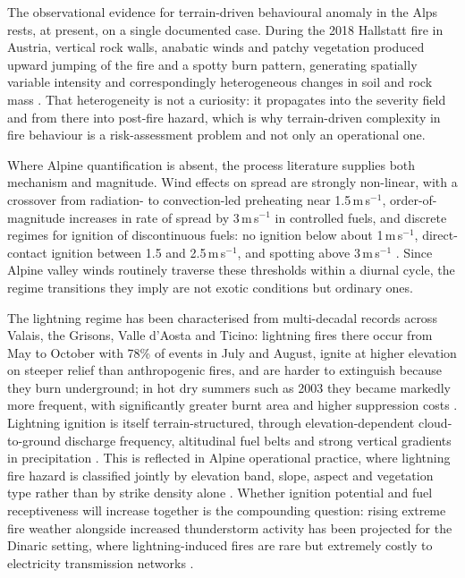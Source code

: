\documentclass[11pt,a4paper]{article}
\begin{document}
The observational evidence for terrain-driven behavioural anomaly in the Alps rests, at present, on a single documented case. During the 2018 Hallstatt fire in Austria, vertical rock walls, anabatic winds and patchy vegetation produced upward jumping of the fire and a spotty burn pattern, generating spatially variable intensity and correspondingly heterogeneous changes in soil and rock mass \citep{melzner_brief_2019}. That heterogeneity is not a curiosity: it propagates into the severity field and from there into post-fire hazard, which is why terrain-driven complexity in fire behaviour is a risk-assessment problem and not only an operational one.

Where Alpine quantification is absent, the process literature supplies both mechanism and magnitude. Wind effects on spread are strongly non-linear, with a crossover from radiation- to convection-led preheating near 1.5\,m\,s$^{-1}$, order-of-magnitude increases in rate of spread by 3\,m\,s$^{-1}$ in controlled fuels, and discrete regimes for ignition of discontinuous fuels: no ignition below about 1\,m\,s$^{-1}$, direct-contact ignition between 1.5 and 2.5\,m\,s$^{-1}$, and spotting above 3\,m\,s$^{-1}$ \citep{hayajneh_wind_2026}. Since Alpine valley winds routinely traverse these thresholds within a diurnal cycle, the regime transitions they imply are not exotic conditions but ordinary ones.

The lightning regime has been characterised from multi-decadal records across Valais, the Grisons, Valle d'Aosta and Ticino: lightning fires there occur from May to October with 78\% of events in July and August, ignite at higher elevation on steeper relief than anthropogenic fires, and are harder to extinguish because they burn underground; in hot dry summers such as 2003 they became markedly more frequent, with significantly greater burnt area and higher suppression costs \citep{conedera_lightninginduced_2006}. Lightning ignition is itself terrain-structured, through elevation-dependent cloud-to-ground discharge frequency, altitudinal fuel belts and strong vertical gradients in precipitation \citep{baranovskiy_deterministic_2021}. This is reflected in Alpine operational practice, where lightning fire hazard is classified jointly by elevation band, slope, aspect and vegetation type rather than by strike density alone \citep{muller_towards_2020}. Whether ignition potential and fuel receptiveness will increase together is the compounding question: rising extreme fire weather alongside increased thunderstorm activity has been projected for the Dinaric setting, where lightning-induced fires are rare but extremely costly to electricity transmission networks \citep{kyriakopoulos_impact_2023}.
\end{document}

